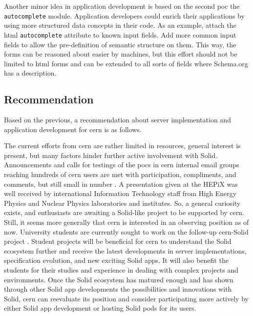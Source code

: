 Another minor idea in application development is based on the second \gls{poc} the \texttt{autocomplete} module.  Application developers could enrich their applications by using more structured data concepts in their code. As an example, attach the \gls{html} \texttt{autocomplete} attribute to known input fields. Add more common input fields to allow the pre-definition of semantic structure on them. This way, the forms can be reasoned about easier by machines, but this effort should not be limited to \gls{html} forms and can be extended to all sorts of fields where Schema.org has a description.

\subsection{Recommendation}

Based on the previous, a recommendation about server implementation and application development for \gls{cern} is as follows.

The current efforts from \gls{cern} are rather limited in resources, general interest is present, but many factors hinder further active involvement with Solid. Announcements and calls for testings of the \glspl{poc} in \gls{cern} internal email groups reaching hundreds of \gls{cern} users are met with participation, compliments, and comments, but still small in number \cite{cern-solid-index}. A presentation given at the HEPiX \cite{hepix} was well received by international Information Technology staff from High Energy Physics and Nuclear Physics laboratories and institutes. So, a general curiosity exists, and enthusiasts are awaiting a Solid-like project to be supported by \gls{cern}. Still, it seems more generally that \gls{cern} is interested in an observing position as of now. University students are currently sought to work on the follow-up \gls{cern}-Solid project \cite{cern-slides}. Student projects will be beneficial for \gls{cern} to understand the Solid ecosystem further and receive the latest developments in server implementations, specification evolution, and new exciting Solid apps. It will also benefit the students for their studies and experience in dealing with complex projects and environments. Once the Solid ecosystem has matured enough and has shown through other Solid app developments the possibilities and innovations with Solid, \gls{cern} can reevaluate its position and consider participating more actively by either Solid app development or hosting Solid pods for its users.
